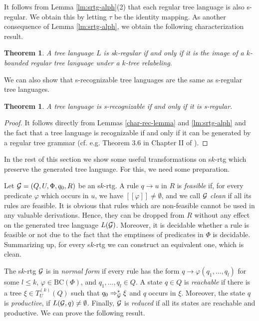 \documentclass[10pt]{scrartcl}
\newtheorem{theo}[df]{Theorem}
\newcommand{\seml}{[\![}
\newcommand{\semr}{]\!]}
\newcommand{\BC}{\mathrm{BC}}
\newcommand{\G}{{\cal G}}
\def\ui#1{^{(#1)}}
\begin{document}
It follows from Lemma \ref{lm:srtg-alph}(2) that each regular tree language is also s-regular. We obtain this by letting $\tau$  be the identity mapping.
As another consequence of Lemma  \ref{lm:srtg-alph}, we obtain the
following characterization result. 

\begin{theo} \label{th:char-reg}
A tree language $L$ is
  s$k$-regular if and only if it is the image of a $k$-bounded regular tree language under a $k$-tree relabeling.
\end{theo}



We can also show that s-recognizable tree languages are the same as s-regular tree languages. 

\begin{theo}\label{th:rec=reg} A tree language is s-recognizable if and only if it is s-regular.
\end{theo}
\begin{proof} It follows directly from Lemmas \ref{char-rec-lemma}
  and \ref{lm:srtg-alph} and the fact that a tree language is recognizable if and only if it can be generated by a regular tree grammar (cf. e.g. Theorem 3.6 in Chapter II of
  \cite{gecste84}).
\end{proof}




In the rest of this section we show some useful transformations on s$k$-rtg which preserve the generated tree language.
For this, we need some preparation.


Let $\G = (Q,U,\Phi,q_0,R)$ be an s$k$-rtg. A rule $q\to u$ in $R$ is {\em feasible} if, for every predicate $\varphi$ which occurs in $u$, we have $\seml \varphi\semr \neq \emptyset$, and we call
$\G$ {\em clean} if all its rules are feasible.  It is obvious that rules which are non-feasible cannot be used in any valuable derivations. 
Hence, they can be dropped from $R$ without any effect on the generated tree language $L(\G)$. Moreover, it is decidable whether a rule is feasible or not due to the fact that the emptiness of predicates in $\Phi$ is  decidable. Summarizing up, for every s$k$-rtg  we can construct an equivalent one, which is clean.


The s$k$-rtg $\G$ is in \emph{normal form} if every rule
has the form $q\to \varphi(q_1,\ldots,q_l)$ for some $l\le k$, $\varphi \in \BC(\Phi)$, and
$q_1,\ldots,q_l \in Q$. A state $q\in Q$ is {\em reachable} if there is a tree $\xi \in T_U\ui k(Q)$ such that  $q_0 \Rightarrow_\G^* \xi$ and $q$ occurs in $\xi$. Moreover, the state  $q$ is {\em productive}, if $L(\G,q)\ne \emptyset$. Finally, $\G$ is {\em reduced} if all its states
are reachable and productive. We can prove the following result.
\end{document}

